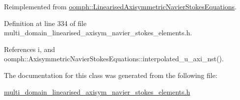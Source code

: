 Reimplemented from \hyperlink{classoomph_1_1LinearisedAxisymmetricNavierStokesEquations_a74c8399c96e4870f831dcc01986a72cd}{oomph\+::\+Linearised\+Axisymmetric\+Navier\+Stokes\+Equations}.



Definition at line 334 of file multi\+\_\+domain\+\_\+linearised\+\_\+axisym\+\_\+navier\+\_\+stokes\+\_\+elements.\+h.



References i, and oomph\+::\+Axisymmetric\+Navier\+Stokes\+Equations\+::interpolated\+\_\+u\+\_\+axi\+\_\+nst().



The documentation for this class was generated from the following file\+:\begin{DoxyCompactItemize}
\item 
\hyperlink{multi__domain__linearised__axisym__navier__stokes__elements_8h}{multi\+\_\+domain\+\_\+linearised\+\_\+axisym\+\_\+navier\+\_\+stokes\+\_\+elements.\+h}\end{DoxyCompactItemize}

